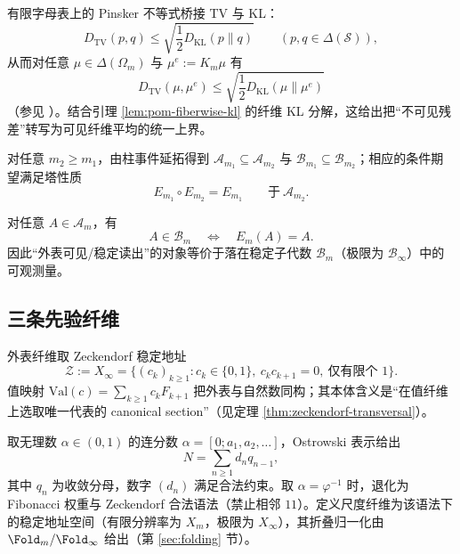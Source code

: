 有限字母表上的 Pinsker 不等式桥接 TV 与 KL：
\begin{equation}
\label{eq:pinsker-tv-kl}
D_{\mathrm{TV}}(p,q)\le \sqrt{\frac{1}{2}D_{\mathrm{KL}}(p\|q)}\qquad (p,q\in\Delta(\mathcal{S})),
\end{equation}
从而对任意 $\mu\in\Delta(\Omega_m)$ 与 $\mu^e:=K_m\mu$ 有
\begin{equation}
\label{eq:pom-residual-tv-by-kl}
D_{\mathrm{TV}}(\mu,\mu^e)\le \sqrt{\frac{1}{2}D_{\mathrm{KL}}(\mu\|\mu^e)}
\end{equation}
（参见 \cite{CoverThomas2006,Tsybakov2009Nonparametric}）。结合引理 \ref{lem:pom-fiberwise-kl} 的纤维 KL 分解，这给出把“不可见残差”转写为可见纤维平均的统一上界。

对任意 $m_2\ge m_1$，由柱事件延拓得到 $\mathcal{A}_{m_1}\subseteq \mathcal{A}_{m_2}$ 与 $\mathcal{B}_{m_1}\subseteq \mathcal{B}_{m_2}$；相应的条件期望满足塔性质
\[
E_{m_1}\circ E_{m_2}=E_{m_1}\qquad\text{于}\ \mathcal{A}_{m_2}.
\]

\begin{remark}[本体可见性判据]\label{rem:pom-visible-criterion}
对任意 $A\in\mathcal{A}_m$，有
\[
A\in\mathcal{B}_m\quad\Longleftrightarrow\quad E_m(A)=A.
\]
因此“外表可见/稳定读出”的对象等价于落在稳定子代数 $\mathcal{B}_m$（极限为 $\mathcal{B}_\infty$）中的可观测量。
\end{remark}

\subsection{三条先验纤维}\label{subsec:pom-fibers}


\begin{definition}\label{def:pom-observable-fiber}
外表纤维取 Zeckendorf 稳定地址
\[
\mathcal Z:=X_\infty=\{(c_k)_{k\ge 1}: c_k\in\{0,1\},\ c_kc_{k+1}=0,\ \text{仅有限个 }1\}.
\]
值映射 $\mathrm{Val}(c)=\sum_{k\ge 1}c_kF_{k+1}$ 把外表与自然数同构；其本体含义是“在值纤维上选取唯一代表的 canonical section”（见定理 \ref{thm:zeckendorf-transversal}）。
\end{definition}

\begin{definition}\label{def:pom-scale-fiber}
取无理数 $\alpha\in(0,1)$ 的连分数 $\alpha=[0;a_1,a_2,\dots]$，Ostrowski 表示给出
\[
N=\sum_{n\ge 1} d_n q_{n-1},
\]
其中 $q_n$ 为收敛分母，数字 $(d_n)$ 满足合法约束。取 $\alpha=\varphi^{-1}$ 时，退化为 Fibonacci 权重与 Zeckendorf 合法语法（禁止相邻 $11$）。定义尺度纤维为该语法下的稳定地址空间（有限分辨率为 $X_m$，极限为 $X_\infty$），其折叠归一化由 $\Fold_m/\Fold_\infty$ 给出（第 \ref{sec:folding} 节）。
\end{definition}

